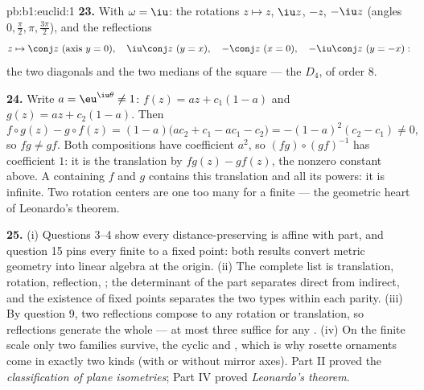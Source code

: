 \begin{solution}{pb:b1:euclid:1}
\textbf{23.} With $\omega = \iu$: the rotations $z \mapsto z$,
$\iu z$, $-z$, $-\iu z$ (angles $0, \frac\pi2, \pi,
\frac{3\pi}2$), and the reflections
\[
z \mapsto \conj z \ (\text{axis } y = 0), \quad
\iu\conj z \ (y = x), \quad
-\conj z \ (x = 0), \quad
-\iu\conj z \ (y = -x):
\]
the two diagonals and the two medians of the square --- the
 $D_4$, of order $8$.

\textbf{24.} Write $a = \eu^{\iu\theta} \neq 1$: $f(z) = az +
c_1(1 - a)$ and $g(z) = az + c_2(1 - a)$. Then
\[
f\circ g(z) - g\circ f(z)
= (1-a)\bigl(ac_2 + c_1 - ac_1 - c_2\bigr)
= -(1 - a)^2(c_2 - c_1) \neq 0 ,
\]
so $f g \neq g f$. Both compositions have  coefficient
$a^2$, so $(fg)\circ(gf)^{-1}$ has  coefficient $1$: it is
the translation by $fg(z) - gf(z)$, the nonzero constant above.
A  containing $f$ and $g$ contains this translation and
all its powers: it is infinite. Two rotation centers are one too
many for a finite  --- the geometric heart of Leonardo's
theorem.

\textbf{25.} (i) Questions 3--4 show every distance-preserving
 is affine with   part, and question 15 pins
every finite  to a fixed point: both results convert
metric geometry into linear algebra at the origin. (ii) The
complete list is translation, rotation, reflection, ; the determinant of the  part separates direct
from indirect, and the existence of fixed points separates the
two types within each parity. (iii) By question 9, two
reflections compose to any rotation or translation, so
reflections generate the whole  --- at most three suffice
for any . (iv) On the finite scale only two families
survive, the cyclic and , which is why rosette
ornaments come in exactly two kinds (with or without mirror
axes). Part II proved the \emph{classification of plane
isometries}; Part IV proved \emph{Leonardo's theorem}.
\end{solution}
